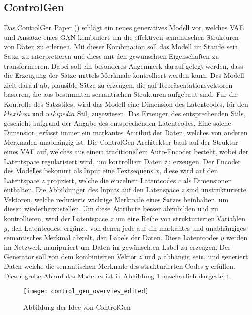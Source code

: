 \subsection{ControlGen}
\label{sub:control_gen}
Das ControlGen Paper (\cite{hu2017controlled}) schlägt ein neues generatives Modell vor, welches \gls{VAE} und Ansätze
eines \gls{GAN} kombiniert um die effektiven semantischen Strukturen von Daten zu erlernen. Mit dieser Kombination soll
das Modell im Stande sein Sätze zu interpretieren und diese mit den gewünschten Eigenschaften zu transformieren. Dabei
soll ein besonderes Augenmerk darauf gelegt werden, dass die Erzeugung der Sätze mittels Merkmale kontrolliert werden
kann.
\newline
\newline
Das Modell zielt darauf ab, plausible Sätze zu erzeugen, die auf Repräsentationsvektoren basieren, die aus bestimmten
semantischen Strukturen aufgebaut sind. Für die Kontrolle des Satzstiles, wird das Modell eine Dimension des
Latentcodes, für den $klexikon$ und $wikipedia$ Stil, zugewiesen. Das Erzeugen des entsprechenden Stils, geschieht
aufgrund der Angabe des entsprechenden Latentcodes. Eine solche Dimension, erfasst immer ein markantes Attribut der
Daten, welches von anderen Merkmalen unabhängig ist.
\newline
\newline
Die ControlGen Architektur baut auf der Struktur eines \gls{VAE} auf, welches aus einem traditionellem Auto-Encoder
besteht, wobei der Latentspace regularisiert wird, um kontrolliert Daten zu erzeugen. Der Encoder des Modelles bekommt
als Input eine Textsequenz $x$, diese wird auf den Latentspace $z$ projiziert, welche die einzelnen Latentcodes $c$ als
Dimensionen enthalten. Die Abbildungen des Inputs auf den Latenspace $z$ sind unstrukturierte Vektoren, welche
reduzierte wichtige Merkmale eines Satzes beinhalten, um diesen wiederherzustellen. Um diese Attribute besser abzubilden
und zu kontrollieren, wird der Latentspace $z$ um eine Reihe von strukturierten Variablen $y$, den Latentcodes, ergänzt,
von denen jede auf ein markantes und unabhängiges semantisches Merkmal abzielt, den Labels der Daten. Diese Latentcodes
$y$ werden im Netzwerk manipuliert um Daten im gewünschten Label zu erzeugen. Der Generator soll von dem kombinierten
Vektor $z$ und $y$ abhängig sein, und generiert Daten welche die semantischen Merkmale des strukturierten Codes $y$
erfüllen. Dieser grobe Ablauf des Modelles ist in Abbildung \ref{fig:control_gen_overview} anschaulich dargestellt.
\begin{figure}[H]
	\centering
	\texttt{[image: control\_gen\_overview\_edited]}
	\caption{Abbildung der Idee von ControlGen}
	\label{fig:control_gen_overview}
\end{figure}
